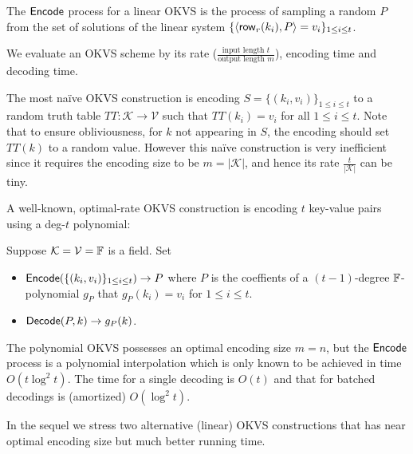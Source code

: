 The ${\sf Encode}$ process for a linear OKVS is the process of sampling a random $P$ from the set of solutions of the linear system $\{\langle {\sf row}_r(k_i), P \rangle = v_i\}_{1\le i\le t}$. 

We evaluate an OKVS scheme by its rate ($\frac{\text{input length }t}{\text{output length }m}$), encoding time and decoding time. 

The most na\"ive OKVS construction is encoding $S = \{(k_i, v_i)\}_{1\le i\le t}$ to a random truth table $TT:\mathcal{K}\rightarrow \mathcal{V}$ such that $TT(k_i) = v_i$ for all $1\le i\le t$. Note that to ensure obliviousness, for $k$ not appearing in $S$, the encoding should set $TT(k)$ to a random value. However this na\"ive construction is very inefficient since it requires the encoding size to be $m=|\mathcal{K}|$, and hence its rate $\frac{t}{|\mathcal{K}|}$ can be tiny. 

A well-known, optimal-rate OKVS construction is encoding $t$ key-value pairs using a deg-$t$ polynomial: 
\begin{construction}[Polynomial]\label{con:OKVS_polynomial}
  Suppose $\mathcal{K} = \mathcal{V}=\mathbb{F}$ is a field. Set 
  \begin{itemize}
    \item ${\sf Encode}(\{(k_i,v_i)\}_{1\le i\le t}) \rightarrow P$ where $P$ is the coeffients of a $(t-1)$-degree $\mathbb{F}$-polynomial $g_P$ that $g_P(k_i) = v_i$ for $1\le i\le t$. 
    \item ${\sf Decode}(P,k)\rightarrow g_P(k)$. 
  \end{itemize}
\end{construction}
The polynomial OKVS possesses an optimal encoding size $m=n$, but the ${\sf Encode}$ process is a polynomial interpolation which is only known to be achieved in time $O(t\log^2t)$. The time for a single decoding is $O(t)$ and that for batched decodings is (amortized) $O(\log^2 t)$. 

In the sequel we stress two alternative (linear) OKVS constructions that has near optimal encoding size but much better running time. 

